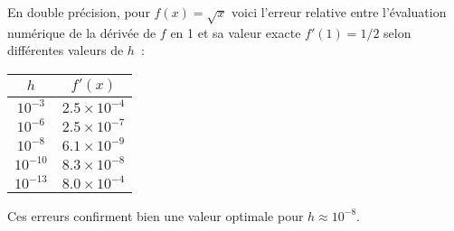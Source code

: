 \documentclass{article}
\begin{document}
En double précision, pour $f(x)=\sqrt{x}$ voici l'erreur relative entre
l'évaluation numérique de la dérivée de $f$ en 1 et sa valeur exacte
$f'(1)=1/2$ selon différentes valeurs de $h$~:
\begin{center}
	\begin{tabular}{|c|c|}
		\hline
		$h$ & $f'(x)$\\
		\hline
		$10^{-3}$ & $2.5 \times 10^{-4}$\\
		\hline
		$10^{-6}$ & $2.5 \times 10^{-7}$\\
		\hline
		$10^{-8}$ & $6.1 \times 10^{-9}$\\
		\hline
		$10^{-10}$ & $8.3 \times 10^{-8}$\\
		\hline
		$10^{-13}$ & $8.0 \times 10^{-4}$\\
		\hline
	\end{tabular}
\end{center}
Ces erreurs confirment bien une valeur optimale pour $h\approx 10^{-8}$.
\end{document}
